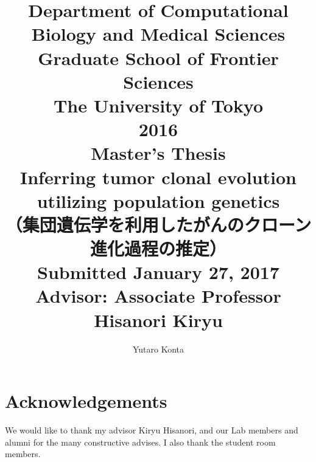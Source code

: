 \documentclass[12pt]{article}
\begin{document}
\title{{\large Department of Computational Biology and Medical Sciences\\Graduate School of Frontier Sciences\\The University of Tokyo}\vspace{4cm}\\2016\\Master's Thesis\vspace{1cm}\\Inferring tumor clonal evolution utilizing population genetics\\（集団遺伝学を利用したがんのクローン進化過程の推定）\vspace{3cm}\\{\large Submitted January 27, 2017\\Advisor: Associate Professor Hisanori Kiryu}\vspace{3cm}}
\author{{\Large Yutaro Konta}}
\date{}
\maketitle
\thispagestyle{empty}
\newpage



\newpage
\tableofcontents
\newpage







%





\section*{Acknowledgements}
We would like to thank my advisor Kiryu Hisanori, and our Lab members and alumni for the many constructive advises.
I also thank the student room members.


\end{document}
